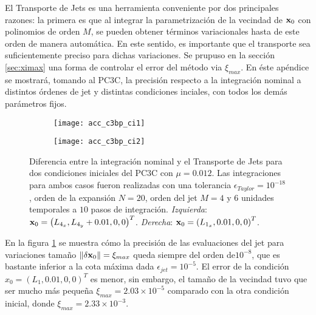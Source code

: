 El Transporte de Jets es una herramienta conveniente por dos principales razones: la primera es que al integrar la parametrización de la vecindad de $\mathbf{x}_0$ con polinomios de orden $M$, se pueden obtener términos variacionales hasta de este orden de manera automática. En este sentido, es importante que el transporte sea suficientemente preciso para dichas variaciones. Se prupuso en la sección \ref{sec:ximax} una forma de controlar el error del método via $\xi_{max}$. En éste apéndice se mostrará, tomando al PC3C, la precisión respecto a la integración nominal a distintos órdenes de jet y distintas condiciones inciales, con todos los demás parámetros fijos. 

\begin{figure}[h!]
\centering
\begin{subfigure}{0.49\textwidth}
	\centering
	\texttt{[image: acc\_c3bp\_ci1]}
\end{subfigure}
%
\begin{subfigure}{0.49\textwidth}
	\centering
	\texttt{[image: acc\_c3bp\_ci2]}
\end{subfigure}
\caption{Diferencia entre la integración nominal y el Transporte de Jets para dos condiciones iniciales del PC3C con $\mu = 0.012$. Las integraciones para ambos casos fueron realizadas con una tolerancia $\epsilon_{Taylor} = 10^{-18}$, orden de la expansión $N=20$, orden del jet $M=4$ y $6$ unidades temporales a $10$ pasos de integración. \textit{Izquierda}: $\mathbf{x}_0 =\left(L_{4_x}, L_{4_y} + 0.01, 0, 0 \right)^T$. \textit{Derecha}: $\mathbf{x}_0 = \left(L_{1_x}, 0.01, 0, 0 \right)^T$.}
\label{fig:acc_ci}
\end{figure}

En la figura \ref{fig:acc_ci} se muestra cómo la precisión de las evaluaciones del jet para variaciones tamaño $\left\lVert\delta \mathbf{x}_0\right\rVert = \xi_{max}$ queda siempre del orden de$10^{-8}$, que es bastante inferior a la cota máxima dada $\epsilon_{jet} = 10^{-5}$. El error de la condición $x_0 = (L_{1}, 0.01, 0,0)^T$ es menor, sin embargo, el tamaño de la vecindad tuvo que ser mucho más pequeña $\xi_{max} = 2.03 \times 10^{-5}$ comparado con la otra condición inicial, donde $\xi_{max} = 2.33 \times 10^{-3}$. 

